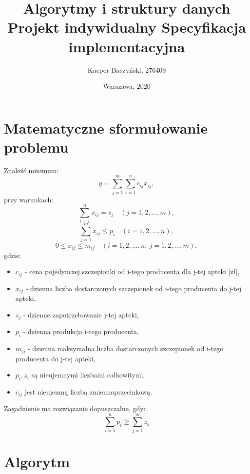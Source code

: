 \documentclass[11pt]{article}
\title{Algorytmy i struktury danych
\\Projekt indywidualny
\bigbreak Specyfikacja implementacyjna}
\author{Kacper Baczyński, 276409}
\date{Warszawa, 2020}
\begin{document}
\maketitle

\section{Matematyczne sformułowanie problemu}
Znaleźć minimum:
$$ y = \sum\limits_{j=1}^{m}\sum\limits_{i=1}^{n}c_{ij}x_{ij}, $$
przy warunkach:
$$ \sum\limits_{i=1}^{n} x_{ij} = z_{j} \quad (j = 1, 2,..., m), $$
$$ \sum\limits_{j=1}^{m} x_{ij} \leq p_{i} \quad (i = 1, 2,..., n), $$
$$ 0 \leq x_{ij} \leq m_{ij} \quad (i = 1, 2,..., n; \ j = 1, 2,..., m), $$
gdzie:
\begin{itemize}
    \item $ c_{ij} $ - cena pojedynczej szczepionki od i-tego producenta dla j-tej apteki [zł],
    \item $ x_{ij} $ - dzienna liczba dostarczonych szczepionek od i-tego producenta do j-tej apteki,
    \item $ z_{j} $ - dzienne zapotrzebowanie j-tej apteki,
    \item $ p_{i} $ - dzienna produkcja i-tego producenta,
    \item $ m_{ij} $ - dzienna maksymalna liczba dostarczonych szczepionek od i-tego producenta do j-tej apteki,
    \item $ p_{i}, z_{i} $ są nieujemnymi liczbami całkowitymi,
    \item $ c_{ij} $ jest nieujemną liczbą zmiennoprzecinkową.
\end{itemize} \hfill \break 
Zagadnienie ma rozwiązanie dopuszczalne, gdy:
$$ \sum\limits_{i=1}^{n} p_{i} \geq \sum\limits_{j=1}^{m} z_{j} $$
\section{Algorytm}
\end{document}
